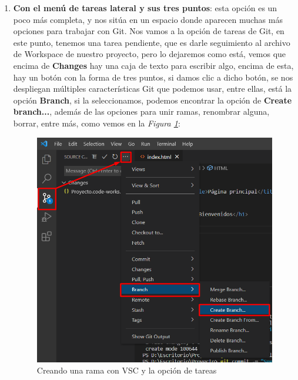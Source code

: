 \begin{enumerate}
    \item \textbf{Con el menú de tareas lateral y sus tres puntos}: esta opción es un poco más completa, y nos sitúa en un espacio donde aparecen muchas más opciones para trabajar con Git. Nos vamos a la opción de tareas de Git, en este punto, tenemos una tarea pendiente, que es darle seguimiento al archivo de Workspace de nuestro proyecto, pero lo dejaremos como está, vemos que encima de \textbf{Changes} hay una caja de texto para escribir algo, encima de esta, hay un botón con la forma de tres puntos, si damos clic a dicho botón, se nos despliegan múltiples características Git que podemos usar, entre ellas, está la opción \textbf{Branch}, si la seleccionamos, podemos encontrar la opción de \textbf{Create branch...}, además de las opciones para unir ramas, renombrar alguna, borrar, entre más, como vemos en la \textit{Figura \ref{fig: 19}}:
    \begin{figure}[H]
        \centering
        \caption{Creando una rama con VSC y la opción de tareas}
        \label{fig: 19}
        \includegraphics[width=\textwidth]{capturas/creando_b2.png}
    \end{figure}
\end{enumerate}


